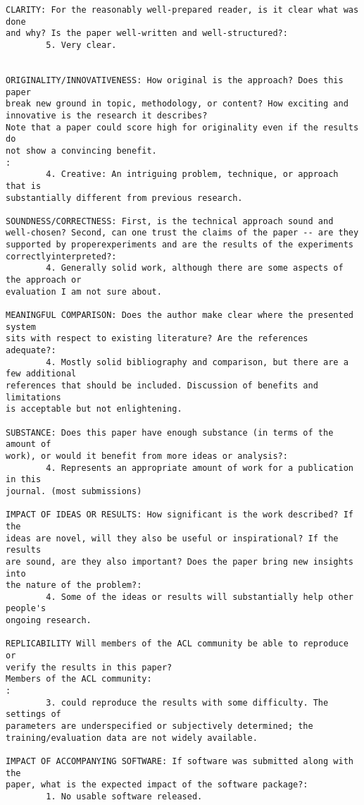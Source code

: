 \documentclass{article}[11pt,oneside]
\begin{document}
\begin{verbatim}
CLARITY: For the reasonably well-prepared reader, is it clear what was done
and why? Is the paper well-written and well-structured?:
        5. Very clear.


ORIGINALITY/INNOVATIVENESS: How original is the approach? Does this paper
break new ground in topic, methodology, or content? How exciting and
innovative is the research it describes?
Note that a paper could score high for originality even if the results do
not show a convincing benefit.
:
        4. Creative: An intriguing problem, technique, or approach that is
substantially different from previous research.

SOUNDNESS/CORRECTNESS: First, is the technical approach sound and
well-chosen? Second, can one trust the claims of the paper -- are they
supported by properexperiments and are the results of the experiments
correctlyinterpreted?:
        4. Generally solid work, although there are some aspects of the approach or
evaluation I am not sure about.

MEANINGFUL COMPARISON: Does the author make clear where the presented system
sits with respect to existing literature? Are the references adequate?:
        4. Mostly solid bibliography and comparison, but there are a few additional
references that should be included. Discussion of benefits and limitations
is acceptable but not enlightening.

SUBSTANCE: Does this paper have enough substance (in terms of the amount of
work), or would it benefit from more ideas or analysis?:
        4. Represents an appropriate amount of work for a publication in this
journal. (most submissions)

IMPACT OF IDEAS OR RESULTS: How significant is the work described? If the
ideas are novel, will they also be useful or inspirational? If the results
are sound, are they also important? Does the paper bring new insights into
the nature of the problem?:
        4. Some of the ideas or results will substantially help other people's
ongoing research.

REPLICABILITY Will members of the ACL community be able to reproduce or
verify the results in this paper?
Members of the ACL community:
:
        3. could reproduce the results with some difficulty. The settings of
parameters are underspecified or subjectively determined; the
training/evaluation data are not widely available.

IMPACT OF ACCOMPANYING SOFTWARE: If software was submitted along with the
paper, what is the expected impact of the software package?:
        1. No usable software released.


\end{verbatim}
\end{document}

